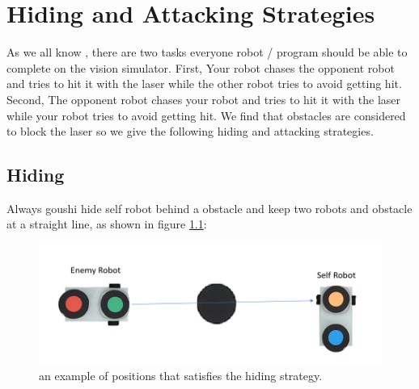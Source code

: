 \chapter{Hiding and Attacking Strategies}
\label{cha:STRATEGIES}

As we all know , there are two tasks everyone robot / program should be able to complete on the vision simulator. First, Your robot chases the opponent robot and tries to hit it with the laser while the other robot tries to avoid getting hit. Second, The opponent robot chases your robot and tries to hit it with the laser while your robot tries to avoid getting hit. We find that obstacles are considered to block the laser so we give the following hiding and attacking strategies. 


\section{Hiding}
Always  goushi hide self robot behind a obstacle and keep two robots and obstacle at a straight line, as shown in figure \ref{hiding_strategy}:

\begin{figure}[thb]
    \centering
    \includegraphics[width=1\textwidth]{images/hiding_strategy.png}
    \caption[hiding strategy]{an example of positions that satisfies the hiding strategy.}\label{hiding_strategy}
\end{figure}

